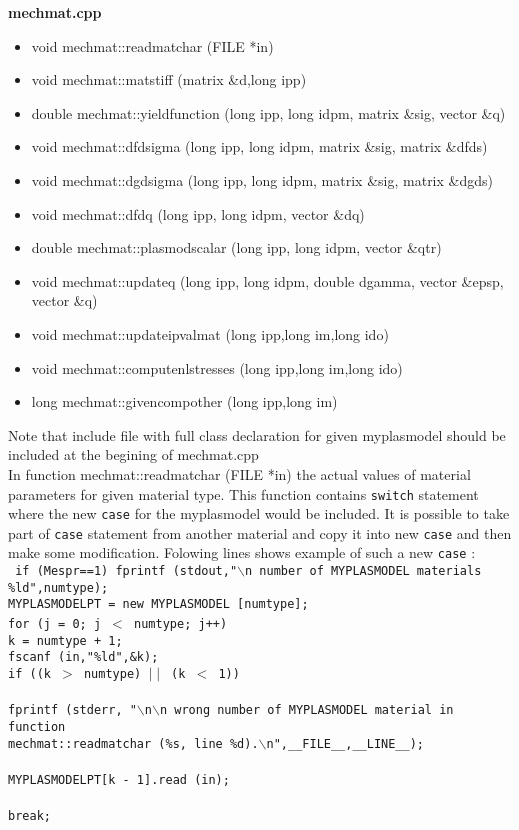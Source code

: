 {\bf mechmat.cpp}\\
\begin{itemize}
\item {\sf void mechmat::readmatchar (FILE *in)}
\item {\sf void mechmat::matstiff (matrix \&d,long ipp)}
\item {\sf double mechmat::yieldfunction (long ipp, long idpm, matrix \&sig, vector \&q)}
\item {\sf void mechmat::dfdsigma (long ipp, long idpm, matrix \&sig, matrix \&dfds)}
\item {\sf void mechmat::dgdsigma (long ipp, long idpm, matrix \&sig, matrix \&dgds)}
\item {\sf void mechmat::dfdq (long ipp, long idpm, vector \&dq)}
\item {\sf double mechmat::plasmodscalar (long ipp, long idpm, vector \&qtr)}
\item {\sf void mechmat::updateq (long ipp, long idpm, double dgamma, vector \&epsp, vector \&q)}
\item {\sf void mechmat::updateipvalmat (long ipp,long im,long ido)}
\item {\sf void mechmat::computenlstresses (long ipp,long im,long ido)}
\item {\sf long mechmat::givencompother (long ipp,long im)}
\end{itemize}
Note that include file with full class declaration for given {\sf myplasmodel} should be included at the begining
of mechmat.cpp\\

In function {\sf mechmat::readmatchar (FILE *in)} the actual values of material parameters for given material type. This function
contains {\tt switch} statement where the new {\tt case} for the  {\sf myplasmodel} would be included.
It is possible to take part of {\tt case} statement from another material and copy it into new {\tt case} and then
make some modification. Folowing lines shows example of such a new {\tt case} :\\
{\tt
      if (Mespr==1)  fprintf (stdout,"$\backslash$n number of MYPLASMODEL materials \%ld",numtype);\\
      MYPLASMODELPT = new MYPLASMODEL [numtype];\\
      for (j = 0; j $<$ numtype; j++){\\
        k = numtype + 1;\\
        fscanf (in,"\%ld",\&k);\\
        if ((k $>$ numtype) $\mid\mid$ (k $<$ 1))\\
        {\\
          fprintf (stderr, "$\backslash$n$\backslash$n wrong number of MYPLASMODEL material in function\\
                   mechmat::readmatchar (\%s, line \%d).$\backslash$n",\_\_FILE\_\_,\_\_LINE\_\_);\\
        }\\
        MYPLASMODELPT[k - 1].read (in);\\
      }\\
      break;\\
}

